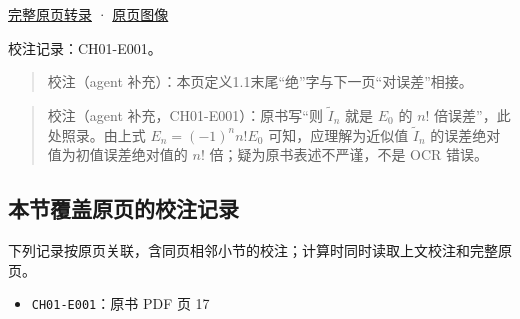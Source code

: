 \documentclass[
  10pt,
  fontset=fandol]{ctexart}
\providecommand{\tightlist}{%
  \setlength{\itemsep}{0pt}\setlength{\parskip}{0pt}}
\begin{document}
\href{../pages/pdf-017.md}{完整原页转录} · \href{../../source-images/pdf-017.jpeg}{原页图像}

校注记录：CH01-E001。

\begin{quote}
校注（agent 补充）：本页定义1.1末尾``绝''字与下一页``对误差''相接。
\end{quote}

\begin{quote}
校注（agent 补充，CH01-E001）：原书写``则 \(\tilde{I}_n\) 就是 \(E_0\) 的 \(n!\) 倍误差''，此处照录。由上式 \(E_n=(-1)^n n!E_0\) 可知，应理解为近似值 \(\tilde{I}_n\) 的误差绝对值为初值误差绝对值的 \(n!\) 倍；疑为原书表述不严谨，不是 OCR 错误。
\end{quote}

\subsection{本节覆盖原页的校注记录}\label{ux672cux8282ux8986ux76d6ux539fux9875ux7684ux6821ux6ce8ux8bb0ux5f55}

下列记录按原页关联，含同页相邻小节的校注；计算时同时读取上文校注和完整原页。

\begin{itemize}
\tightlist
\item
  \texttt{CH01-E001}：原书 PDF 页 17
\end{itemize}
\end{document}
